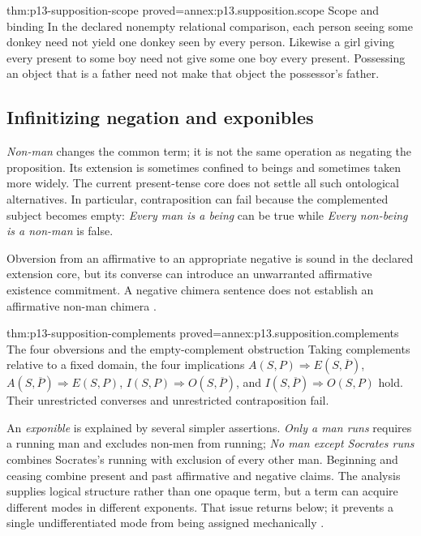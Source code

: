 \begin{hbtheorem}{thm:p13-supposition-scope}
 {proved=annex:p13.supposition.scope}
 {Scope and binding}
In the declared nonempty relational comparison, each person seeing
some donkey need not yield one donkey seen by every person.
Likewise a girl giving every present to some boy need not give some
one boy every present. Possessing an object that is a father need
not make that object the possessor's father.
\end{hbtheorem}

\subsection{Infinitizing negation and exponibles}
\label{sec:p13-supposition-infinitizing}

\emph{Non-man} changes the common term; it is not the same operation
as negating the proposition. Its extension is sometimes confined to
beings and sometimes taken more widely. The current present-tense
core does not settle all such ontological alternatives. In particular,
contraposition can fail because the complemented subject becomes
empty: \emph{Every man is a being} can be true while
\emph{Every non-being is a non-man} is false.

Obversion from an affirmative to an appropriate negative is sound
in the declared extension core, but its converse can introduce
an unwarranted affirmative existence commitment. A negative chimera
sentence does not establish an affirmative non-man chimera
\cite[pp.~177--179]{Parsons2007FordhamSupposition}.

\begin{hbtheorem}{thm:p13-supposition-complements}
 {proved=annex:p13.supposition.complements}
 {The four obversions and the empty-complement obstruction}
Taking complements relative to a fixed domain, the four implications
\(A(S,P)\Rightarrow E(S,\overline P)\),
\(A(S,\overline P)\Rightarrow E(S,P)\),
\(I(S,P)\Rightarrow O(S,\overline P)\), and
\(I(S,\overline P)\Rightarrow O(S,P)\) hold.
Their unrestricted converses and unrestricted contraposition fail.
\end{hbtheorem}

An \emph{exponible} is explained by several simpler assertions.
\emph{Only a man runs} requires a running man and excludes non-men
from running; \emph{No man except Socrates runs} combines Socrates's
running with exclusion of every other man. Beginning and ceasing
combine present and past affirmative and negative claims.
The analysis supplies logical structure rather than one opaque term,
but a term can acquire different modes in different exponents.
That issue returns below; it prevents a single undifferentiated
mode from being assigned mechanically
\cite[pp.~184--186,259--260]{Parsons2007FordhamSupposition}.


